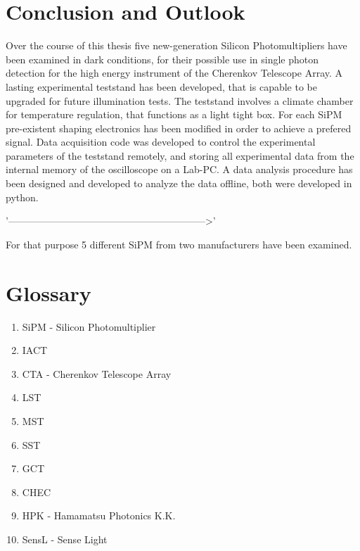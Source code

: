 \documentclass[12pt,article,type=msc,colorback,accentcolor=tud9c]{tudthesis}
\begin{document}
\section{\Large Conclusion and Outlook}

Over the course of this thesis five new-generation Silicon Photomultipliers have been examined in dark conditions, for their possible use in single photon detection for the high energy instrument of the Cherenkov Telescope Array. A lasting experimental teststand has been developed, that is capable to be upgraded for future illumination tests. The teststand involves a climate chamber for temperature regulation, that functions as a light tight box. For each SiPM pre-existent shaping electronics has been modified in order to achieve a prefered signal. Data acquisition code was developed to control the experimental parameters of the teststand remotely, and storing all experimental data from the internal memory of the oscilloscope on a Lab-PC. A data analysis procedure has been designed and developed to analyze the data offline, both were developed in python. 


'------------------------------------------------------------>'



For that purpose 5 different SiPM from two manufacturers have been examined.

\newpage
\section{\Large Glossary}
\begin{enumerate}
\item SiPM - Silicon Photomultiplier
\item IACT
\item CTA - Cherenkov Telescope Array
\item LST
\item MST
\item SST
\item GCT
\item CHEC



\item HPK - Hamamatsu Photonics K.K.
\item SensL - Sense Light
\end{enumerate}
\end{document}
